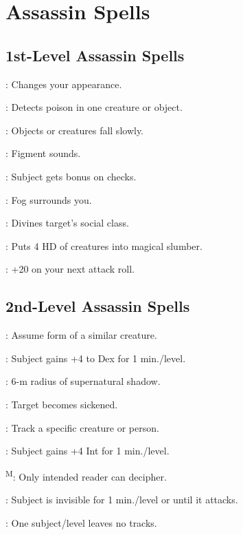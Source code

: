 \section{Assassin Spells}




\subsection{1st-Level Assassin Spells}

: Changes your appearance.

: Detects poison in one creature or object.

: Objects or creatures fall slowly.

: Figment sounds.

: Subject gets bonus on  checks.

: Fog surrounds you.

: Divines target's social class. %

: Puts 4 HD of creatures into magical slumber.

: +20 on your next attack roll.




\subsection{2nd-Level Assassin Spells}

: Assume form of a similar creature.

: Subject gains +4 to Dex for 1 min./level.

: 6-m radius of supernatural shadow.

: Target becomes sickened. %

: Track a specific creature or person. %

: Subject gains +4 Int for 1 min./level.

\textsuperscript{M}: Only intended reader can decipher.

: Subject is invisible for 1 min./level or until it attacks.

: One subject/level leaves no tracks.

